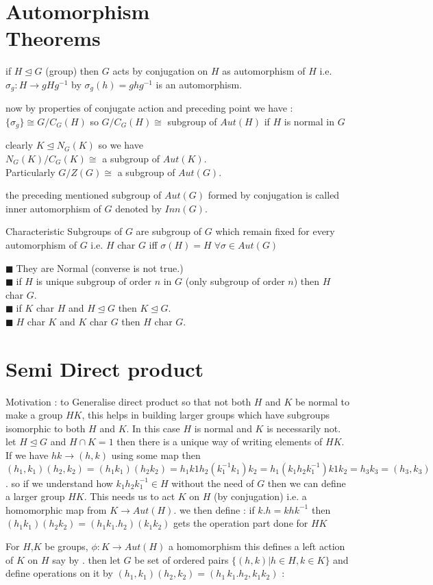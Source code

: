 \documentclass[11pt]{extarticle}
\newcommand{\ra}{\rightarrow}
\newcommand{\y}{$\blacksquare\;$}
\newcommand{\tbx}[2][]{
	\begin{tcolorbox}[enhanced,breakable,size=small,colback=black!2!white,title={#1},arc is angular, arc=1.5mm,drop fuzzy shadow]
		#2
	\end{tcolorbox}
}
\begin{document}
\begin{multicols}{2}
	\section{Automorphism 
		\\ Theorems}
	\tbx{if $ H \trianglelefteq G$ (group) then $ G $ acts by conjugation on $ H $ as automorphism of $ H $ i.e.
		$ \sigma_g: H\ra gHg^{-1} $ by $ \sigma_g(h)=ghg^{-1} $ is an automorphism. 
	}
	\tbx{now by properties of conjugate action and preceding point we have :\\
		$ \{\sigma_g\}\cong G/C_G(H) $ so $ G/C_G(H) \cong $ subgroup of $ Aut(H) $ if $ H $ is normal in $ G $ 
	}
	\tbx{clearly $ K \trianglelefteq N_G(K) $ so we have \\
		$ N_G(K)/C_G(K) \cong $ a subgroup of $ Aut(K) .$\\
		Particularly $ G/Z(G) \cong $ a subgroup of $ Aut(G) .$
	}
	\tbx{the preceding mentioned subgroup of $ Aut(G) $ formed by conjugation is called inner automorphism of $ G $ denoted by 
		$ Inn(G) .$
	}
	\tbx[\textbf{Characteristic Subgroups }]{Characteristic Subgroups of  $ G $ are subgroup of  $ G $ which remain fixed for every automorphism 
		of $ G $ i.e. $ H  $ char $ G $ iff $ \sigma (H)=H \; \forall \sigma \in Aut(G) $
	}
	\tbx[Properties of Characteristic Subgroups ]{
		
			\y  They are Normal (converse is not true.) \\
			\y  if $ H $ is unique subgroup of order $ n $ in $ G $ (only subgroup of order $ n $) then $ H $ char $ G. $ \\
			\y  if $ K $ char $H$ and $ H\trianglelefteq G $ then $ K\trianglelefteq G .$ \\
			\y  $ H $ char $ K $  and $ K $ char $ G $ then $ H $ char $ G .$  
	}

		\section{Semi Direct product}
	
	\tbx{Motivation :  to Generalise direct product so that not both $ H $ and $ K $ be normal to make a group 
		$ HK $, this helps in building larger groups which have subgroups isomorphic to both $ H $ and $ K $. In this case $ H $ is normal and $ K $ is necessarily not.
		let $ H \trianglelefteq G $ and $ H\cap K=1 $ then there is a unique way of writing elements of $ HK $.
		If we have $ hk \ra (h,k) $ using some map then $ (h_1,k_1)(h_2,k_2)=(h_1k_1)(h_2k_2)=h_1k1h_2 (k_1^{-1}k_1) k_2=h_1(k_1h_2k_1^{-1}) k1k_2= h_3 k_3=(h_3,k_3)$. so if we understand how  $k_1h_2k_1^{-1}  \in H$ without the need of $ G $ then we can define a larger group $ HK $. This needs us to act $ K $ on $ H $ (by conjugation)  
		i.e. a homomorphic map from $ K \ra Aut(H). $ we then define :  if $ k.h= k h k^{-1} $ then $ (h_1k_1)(h_2k_2) 
		= (h_1k_1.h_2)(k_1k_2)$ gets the operation part done for $ HK $
	}
	\tbx{For $  H$,$ K $ be groups, $ \phi :K \ra Aut(H) $ a homomorphism this defines a left action of $ K $ on $ H $ say by $ . $ then let $ G $ be set of ordered pairs $ \{(h,k)|h\in H, k\in K\} $ and define operations on it by 
		$ (h_1,k_1)(h_2,k_2)=(h_1\, k_1.h_2, k_1k_2) $ :
		
}
\end{multicols}
\end{document}
